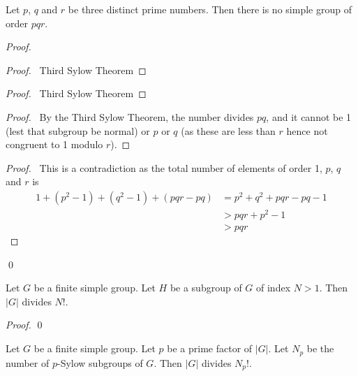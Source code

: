 \begin{prop}
\label{prop:pqr-not-simple}
Let $p$, $q$ and $r$ be three distinct prime numbers.	Then there is no simple group of order $pqr$.
\end{prop}

\begin{proof}
\pf
{}
\begin{proof}
	\pf\ Third Sylow Theorem
\end{proof}
\begin{proof}
	\pf\ Third Sylow Theorem
\end{proof}
\begin{proof}
	\pf\ By the Third Sylow Theorem, the number divides $pq$, and it cannot be 1 (lest that subgroup be normal) or $p$ or $q$ (as these are less than $r$ hence not congruent to 1 modulo $r$).
\end{proof}
\qedstep
\begin{proof}
	\pf\ This is a contradiction as the total number of elements of order 1, $p$, $q$ and $r$ is
	\begin{align*}
		1 + (p^2 - 1) + (q^2 - 1) + (pqr - pq)
		& = p^2 + q^2 + pqr - pq - 1 \\
		& > pqr + p^2 - 1 \\
		& > pqr
	\end{align*}
\end{proof}
\qed
\end{proof}

\begin{prop}
Let $G$ be a finite simple group. Let $H$ be a subgroup of $G$ of index $N > 1$. Then $|G|$ divides $N!$.
\end{prop}

\begin{proof}
\pf
{}
\qed
\end{proof}

\begin{cor}
\label{cor:G-divides-Npfac}
Let $G$ be a finite simple group. Let $p$ be a prime factor of $|G|$.
Let $N_p$ be the number of $p$-Sylow subgroups of $G$. Then $|G|$ divides $N_p!$.
\end{cor}

